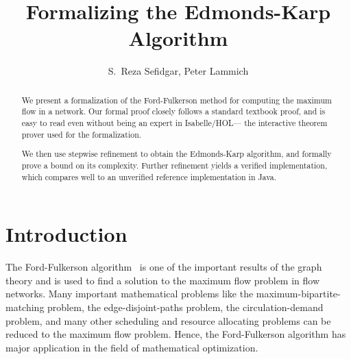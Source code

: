 \documentclass{llncs}
\begin{document}
\title{Formalizing the Edmonds-Karp Algorithm}

\author{S.~Reza Sefidgar, Peter Lammich}


\maketitle
\begin{abstract}
We present a formalization of the Ford-Fulkerson method for computing the maximum flow in a network.
Our formal proof closely follows a standard textbook proof, and is easy to read even without being
an expert in Isabelle/HOL--- the interactive theorem prover used for the formalization.
% 
% 

We then use stepwise refinement to obtain the Edmonds-Karp algorithm, and formally prove a bound on its complexity.
Further refinement yields a verified implementation, which compares well to an unverified reference implementation in Java.



% 
% 
\end{abstract}

\section{Introduction}
The Ford-Fulkerson algorithm~\cite{FF56} is one of the important results of the graph theory and is used to find a solution to the maximum flow problem in flow networks. Many important mathematical problems like the maximum-bipartite-matching problem, the edge-disjoint-paths problem, the circulation-demand problem, and many other scheduling and resource allocating problems can be reduced to the maximum flow problem. Hence, the Ford-Fulkerson algorithm has major application in the field of mathematical optimization.
\end{document}
